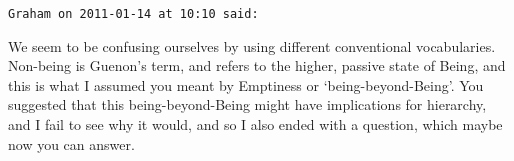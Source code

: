 \begin{footnotesize}
\begin{sffamily}
\hfill

\texttt{Graham on 2011-01-14 at 10:10 said: }

We seem to be confusing ourselves by using different conventional vocabularies. Non-being is Guenon's term, and refers to the higher, passive state of Being, and this is what I assumed you meant by Emptiness or `being-beyond-Being'. You suggested that this being-beyond-Being might have implications for hierarchy, and I fail to see why it would, and so I also ended with a question, which maybe now you can answer.


\end{sffamily}\end{footnotesize}
